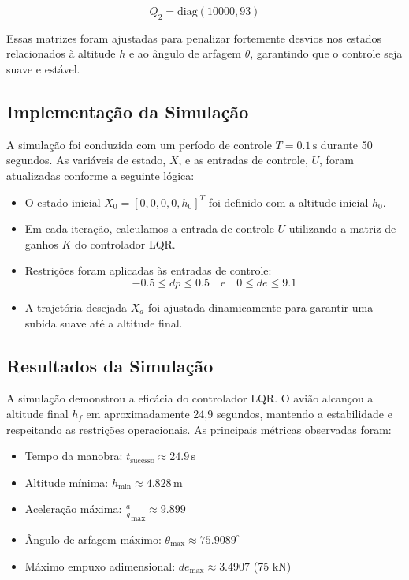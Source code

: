 \documentclass[a4paper, 12pt]{article}
\begin{document}
\[
Q_2 = \text{diag}(10000, 93)
\]

Essas matrizes foram ajustadas para penalizar fortemente desvios nos estados relacionados à altitude \( h \) e ao ângulo de arfagem \( \theta \), garantindo que o controle seja suave e estável.

\subsection{ Implementação da Simulação}

A simulação foi conduzida com um período de controle \( T = 0.1 \, \text{s} \) durante 50 segundos. As variáveis de estado, \( X \), e as entradas de controle, \( U \), foram atualizadas conforme a seguinte lógica:

\begin{itemize}
    \item O estado inicial \( X_0 = [0, 0, 0, 0, h_0]^T \) foi definido com a altitude inicial \( h_0 \).
    \item Em cada iteração, calculamos a entrada de controle \( U \) utilizando a matriz de ganhos \( K \) do controlador LQR.
    \item Restrições foram aplicadas às entradas de controle:
    \[
    -0.5 \leq dp \leq 0.5 \quad \text{e} \quad 0 \leq de \leq 9.1
    \]
    \item A trajetória desejada \( X_d \) foi ajustada dinamicamente para garantir uma subida suave até a altitude final.
\end{itemize}

\subsection{ Resultados da Simulação}

A simulação demonstrou a eficácia do controlador LQR. O avião alcançou a altitude final \( h_f \) em aproximadamente 24,9 segundos, mantendo a estabilidade e respeitando as restrições operacionais. As principais métricas observadas foram:

\begin{itemize}
    \item Tempo da manobra: \( t_{\text{sucesso}} \approx 24.9 \, \text{s} \)
    \item Altitude mínima: \( h_{\text{min}} \approx 4.828 \, \text{m} \)
    \item Aceleração máxima: \( \frac{a}{g}_{\text{max}} \approx 9.899 \)
    \item Ângulo de arfagem máximo: \( \theta_{\text{max}} \approx 75.9089^\circ \)
    \item Máximo empuxo adimensional: \( de_{\text{max}} \approx 3.4907 \) (75 kN)
\end{itemize}
\end{document}

